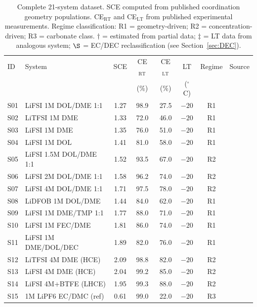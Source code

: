 \documentclass[11pt]{article}
\theoremstyle{plain}
\theoremstyle{definition}
\theoremstyle{remark}
\begin{document}
\begin{table}[h!]
\centering
\caption{Complete 21-system dataset. SCE computed from published coordination
geometry populations. CE$_{\mathrm{RT}}$ and CE$_{\mathrm{LT}}$ from published
experimental measurements. Regime classification: R1 = geometry-driven; R2 =
concentration-driven; R3 = carbonate class.
$\dagger$ = estimated from partial data; $\ddagger$ = LT data from analogous
system; $\S$ = EC/DEC reclassification (see Section~\ref{sec:DEC}).}
\label{tab:master}
\small
\begin{tabular}{llcccccl}
\toprule
ID & System & SCE & CE$_{\mathrm{RT}}$ & CE$_{\mathrm{LT}}$ & LT & Regime & Source \\
   &        &     & (\%) & (\%) & ($^{\circ}$C) & & \\
\midrule
S01 & LiFSI 1M DOL/DME 1:1 & 1.27 & 98.9 & 27.5 & $-20$ & R1 & \cite{Holoubek2021} \\
S02 & LiTFSI 1M DME & 1.33 & 72.0 & 46.0 & $-20$ & R1 & \cite{Qian2015} \\
S03 & LiFSI 1M DME & 1.35 & 76.0 & 51.0 & $-20$ & R1 & \cite{Qian2015} \\
S04 & LiFSI 1M DOL & 1.41 & 81.0 & 58.0 & $-20$ & R1 & \cite{Holoubek2021} \\
S05 & LiFSI 1.5M DOL/DME 1:1 & 1.52 & 93.5 & 67.0 & $-20$ & R2 & \cite{Holoubek2021} \\
S06 & LiFSI 2M DOL/DME 1:1 & 1.58 & 96.2 & 74.0 & $-20$ & R2 & \cite{Holoubek2021} \\
S07 & LiFSI 4M DOL/DME 1:1 & 1.71 & 97.5 & 78.0 & $-20$ & R2 & \cite{Holoubek2021} \\
S08 & LiDFOB 1M DOL/DME & 1.44 & 84.0 & 62.0 & $-20$ & R1 & \cite{Adams2021} \\
S09 & LiFSI 1M DME/TMP 1:1 & 1.77 & 88.0 & 71.0 & $-20$ & R1 & \cite{Wan2021} \\
S10 & LiFSI 1M FEC/DME & 1.81 & 86.0 & 74.0 & $-20$ & R1 & \cite{Chen2022} \\
S11 & LiFSI 1M DME/DOL/DEC & 1.89 & 82.0 & 76.0 & $-20$ & R1 & \cite{Peng2022} \\
S12 & LiTFSI 4M DME (HCE) & 2.09 & 98.8 & 82.0 & $-20$ & R2 & \cite{Qian2015} \\
S13 & LiFSI 4M DME (HCE) & 2.04 & 99.2 & 85.0 & $-20$ & R2 & \cite{Ren2018} \\
S14 & LiFSI 4M+BTFE (LHCE) & 1.95 & 99.3 & 88.0 & $-20$ & R2 & \cite{Ren2018} \\
S15 & 1M LiPF6 EC/DMC (ref) & 0.61 & 99.0 & 22.0 & $-20$ & R3 & \cite{Zhang2020} \\

\end{tabular}
\end{table}
\end{document}

